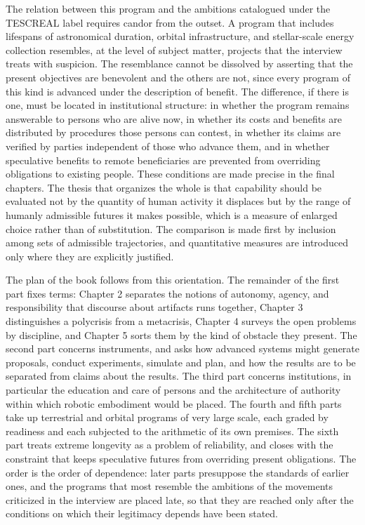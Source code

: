 The relation between this program and the ambitions catalogued under the TESCREAL label requires candor from the outset. A program that includes lifespans of astronomical duration, orbital infrastructure, and stellar-scale energy collection resembles, at the level of subject matter, projects that the interview treats with suspicion. The resemblance cannot be dissolved by asserting that the present objectives are benevolent and the others are not, since every program of this kind is advanced under the description of benefit. The difference, if there is one, must be located in institutional structure: in whether the program remains answerable to persons who are alive now, in whether its costs and benefits are distributed by procedures those persons can contest, in whether its claims are verified by parties independent of those who advance them, and in whether speculative benefits to remote beneficiaries are prevented from overriding obligations to existing people. These conditions are made precise in the final chapters. The thesis that organizes the whole is that capability should be evaluated not by the quantity of human activity it displaces but by the range of humanly admissible futures it makes possible, which is a measure of enlarged choice rather than of substitution. The comparison is made first by inclusion among sets of admissible trajectories, and quantitative measures are introduced only where they are explicitly justified.

The plan of the book follows from this orientation. The remainder of the first part fixes terms: Chapter 2 separates the notions of autonomy, agency, and responsibility that discourse about artifacts runs together, Chapter 3 distinguishes a polycrisis from a metacrisis, Chapter 4 surveys the open problems by discipline, and Chapter 5 sorts them by the kind of obstacle they present. The second part concerns instruments, and asks how advanced systems might generate proposals, conduct experiments, simulate and plan, and how the results are to be separated from claims about the results. The third part concerns institutions, in particular the education and care of persons and the architecture of authority within which robotic embodiment would be placed. The fourth and fifth parts take up terrestrial and orbital programs of very large scale, each graded by readiness and each subjected to the arithmetic of its own premises. The sixth part treats extreme longevity as a problem of reliability, and closes with the constraint that keeps speculative futures from overriding present obligations. The order is the order of dependence: later parts presuppose the standards of earlier ones, and the programs that most resemble the ambitions of the movements criticized in the interview are placed late, so that they are reached only after the conditions on which their legitimacy depends have been stated.

